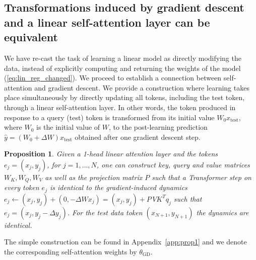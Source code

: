 \documentclass{article}
\newtheorem{prop}{Proposition}
\theoremstyle{plain}
\theoremstyle{definition}
\theoremstyle{remark}
\begin{document}
\subsection*{Transformations induced by gradient descent and a linear self-attention layer can be equivalent}

We have re-cast the task of learning a linear model as directly modifying the data, instead of explicitly computing and returning the weights of the model (\eqref{eq:lin_reg_changed}). We proceed to establish a connection between self-attention and gradient descent. We provide a construction where learning takes place simultaneously by directly updating all tokens, including the test token, through a linear self-attention layer. In other words, the token produced in response to a query (test) token is transformed from its initial value $W_0 x_{\text{test}}$, where $W_0$ is the initial value of $W$, to the post-learning prediction $\hat{y} = (W_0 + \Delta W) x_{\text{test}}$ obtained after one gradient descent step.

\begin{prop}
\label{prop:self_att_gd}
Given a 1-head linear attention layer and the tokens $e_j = (x_j, y_j)$, for $j=1,\ldots,N$, one can construct key, query and value matrices $W_K, W_Q, W_V$ as well as the projection matrix $P$ such that a Transformer step on every token $e_j$ is identical to the gradient-induced dynamics $ e_j \leftarrow (x_j, y_j) + (0, -\Delta W x_j) = (x_j, y_j) + P \,V K^{T}q_{j}$ such that $e_j = (x_j, y_j - \Delta y_j)$. For the test data token $(x_{N+1}, y_{N+1})$ the dynamics are identical.
\end{prop}
The simple construction can be found in Appendix~\ref{app:prop1} and we denote the corresponding self-attention weights by  $\theta_{\text{GD}}$.
\end{document}
